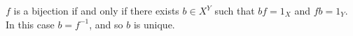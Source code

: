 $f$ is a bijection if and only if there exists $b \in X^Y$ such that $bf = 1_X$ and $fb = 1_Y$. In this case $b = f^{-1}$, and so $b$ is unique.
